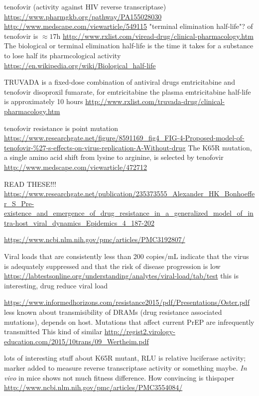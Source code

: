 \documentclass[DIV=15]{scrartcl}
\begin{document}

  




tenofovir (activity against HIV reverse transcriptase) \url{https://www.pharmgkb.org/pathway/PA155028030}
\url{http://www.medscape.com/viewarticle/549115}
"terminal elimination half-life"? of tenofovir is $\approx 17$h
\url{http://www.rxlist.com/viread-drug/clinical-pharmacology.htm}
The biological or terminal elimination half-life is the time it takes for a substance to lose half its pharmcological activity
\url{https://en.wikipedia.org/wiki/Biological_half-life}


TRUVADA is a fixed-dose combination of antiviral drugs emtricitabine and tenofovir disoproxil fumarate, for emtricitabine the plasma emtricitabine half-life is approximately 10 hours
\url{http://www.rxlist.com/truvada-drug/clinical-pharmacology.htm}

tenofovir resistance is point mutation
\url{https://www.researchgate.net/figure/8591169_fig4_FIG-4-Proposed-model-of-tenofovir-%27-s-effects-on-virus-replication-A-Without-drug}
The K65R mutation, a single amino acid shift from lysine to arginine, is selected by tenofovir
\url{http://www.medscape.com/viewarticle/472712}



READ THESE!!!
\url{https://www.researchgate.net/publication/235373555_Alexander_HK_Bonhoeffer_S_Pre-existence_and_emergence_of_drug_resistance_in_a_generalized_model_of_intra-host_viral_dynamics_Epidemics_4_187-202}

\url{https://www.ncbi.nlm.nih.gov/pmc/articles/PMC3192807/}


Viral loads that are consistently less than 200 copies/mL indicate that the virus is adequately suppressed and that the risk of disease progression is low
\url{https://labtestsonline.org/understanding/analytes/viral-load/tab/test}
this is interesting, drug reduce viral load


\url{https://www.informedhorizons.com/resistance2015/pdf/Presentations/Oster.pdf}
less known about transmisibility of DRAMs (drug resistance associated mutations), depends on host. Mutations that affect current PrEP are infrequently transmitted
 This kind of similar
 \url{http://regist2.virology-education.com/2015/10trans/09_Wertheim.pdf}
 
 
 lots of interesting stuff about K65R mutant, RLU is relative luciferase activity; marker added to measure reverse transcriptase activity or something maybe. \textit{In vivo} in mice shows not much fitness difference. How convincing is thispaper
 \url{http://www.ncbi.nlm.nih.gov/pmc/articles/PMC3554084/}
\end{document}
